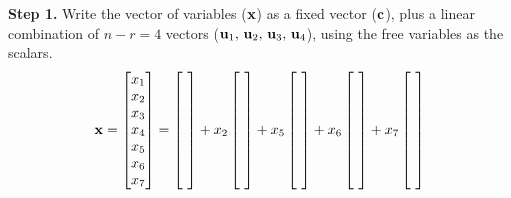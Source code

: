 \documentclass{ximera}
\begin{document}
\begin{example}
  \textbf{Step 1.}  Write the vector of variables ($\mathbf{x}$) as a
  fixed vector ($\mathbf{c}$), plus a linear combination of $n-r=4$
  vectors ($\mathbf{u}_1,\,\mathbf{u}_2,\,\mathbf{u}_3,\,\mathbf{u}_4$), using
  the free variables as the scalars.
  \[
    \mathbf{x}=\begin{bmatrix}x_1\\x_2\\x_3\\x_4\\x_5\\x_6\\x_7\end{bmatrix}=
    \begin{bmatrix}\ \\\ \\\ \\\ \\\ \\\ \\\ \end{bmatrix}+
    x_2\begin{bmatrix}\ \\\ \\\ \\\ \\\ \\\ \\\ \end{bmatrix}+
    x_5\begin{bmatrix}\ \\\ \\\ \\\ \\\ \\\ \\\ \end{bmatrix}+
    x_6\begin{bmatrix}\ \\\ \\\ \\\ \\\ \\\ \\\ \end{bmatrix}+
    x_7\begin{bmatrix}\ \\\ \\\ \\\ \\\ \\\ \\\ \end{bmatrix}
  \]


\end{example}
\end{document}
